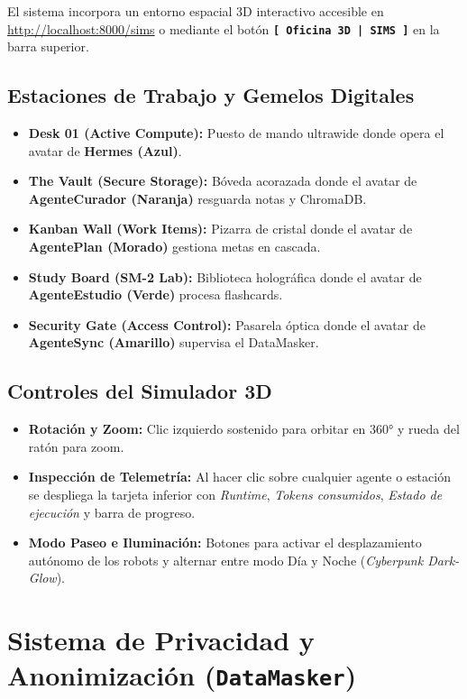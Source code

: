 \documentclass[11pt,a4paper]{article}
\begin{document}
El sistema incorpora un entorno espacial 3D interactivo accesible en \href{http://localhost:8000/sims}{http://localhost:8000/sims} o mediante el botón \textbf{\texttt{[ Oficina 3D | SIMS ]}} en la barra superior.

\subsection{Estaciones de Trabajo y Gemelos Digitales}
\begin{itemize}
    \item \textbf{Desk 01 (Active Compute):} Puesto de mando ultrawide donde opera el avatar de \textbf{Hermes (Azul)}.
    \item \textbf{The Vault (Secure Storage):} Bóveda acorazada donde el avatar de \textbf{AgenteCurador (Naranja)} resguarda notas y ChromaDB.
    \item \textbf{Kanban Wall (Work Items):} Pizarra de cristal donde el avatar de \textbf{AgentePlan (Morado)} gestiona metas en cascada.
    \item \textbf{Study Board (SM-2 Lab):} Biblioteca holográfica donde el avatar de \textbf{AgenteEstudio (Verde)} procesa flashcards.
    \item \textbf{Security Gate (Access Control):} Pasarela óptica donde el avatar de \textbf{AgenteSync (Amarillo)} supervisa el DataMasker.
\end{itemize}

\subsection{Controles del Simulador 3D}
\begin{itemize}
    \item \textbf{Rotación y Zoom:} Clic izquierdo sostenido para orbitar en 360° y rueda del ratón para zoom.
    \item \textbf{Inspección de Telemetría:} Al hacer clic sobre cualquier agente o estación se despliega la tarjeta inferior con \textit{Runtime}, \textit{Tokens consumidos}, \textit{Estado de ejecución} y barra de progreso.
    \item \textbf{Modo Paseo e Iluminación:} Botones para activar el desplazamiento autónomo de los robots y alternar entre modo Día y Noche (\textit{Cyberpunk Dark-Glow}).
\end{itemize}

\section{Sistema de Privacidad y Anonimización (\texttt{DataMasker})}
\end{document}
